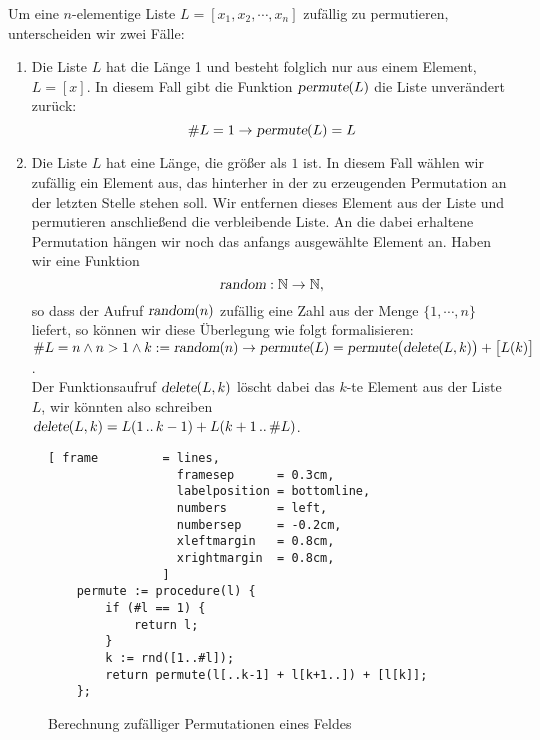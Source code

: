 Um eine $n$-elementige Liste $L = [x_1,x_2, \cdots, x_n]$ zuf\"allig zu permutieren,
unterscheiden wir zwei F\"alle:
\begin{enumerate}
\item Die Liste $L$ hat die L\"ange 1 und besteht folglich nur aus einem Element, $L = [x]$.
      In diesem Fall gibt die Funktion $\textsl{permute}(L)$ die Liste unver\"andert zur\"uck:
      \[ \#L = 1 \rightarrow \textsl{permute}(L) = L \]
\item Die Liste $L$ hat eine L\"ange, die gr\"o\ss{}er als $1$ ist.  In diesem Fall w\"ahlen wir
      zuf\"allig ein Element aus, das hinterher  in der zu erzeugenden Permutation an der letzten Stelle
      stehen soll.  Wir entfernen dieses Element aus der Liste und permutieren
      anschlie\ss{}end die verbleibende Liste.  An die dabei erhaltene Permutation h\"angen wir
      noch das anfangs ausgew\"ahlte Element an.  Haben wir eine Funktion
      \[ \textsl{random}: \mathbb{N} \rightarrow \mathbb{N}, \]
      so dass der Aufruf $\textsl{random}(n)$ zuf\"allig eine Zahl aus der Menge $\{1,\cdots,n\}$
      liefert, so k\"onnen wir diese \"Uberlegung wie folgt formalisieren:
      \\[0.2cm]
      \hspace*{-0.8cm}
      $\#L = n \wedge n > 1 \wedge k :=\textsl{random}(n)  \rightarrow 
         \textsl{permute}(L) = \textsl{permute}\bigl(\textsl{delete}(L,k)\bigr) + \bigl[ L(k)
         \bigr]
      $.
\\[0.2cm]
      Der  Funktionsaufruf $\textsl{delete}(L,k)$ l\"oscht dabei das $k$-te Element aus der Liste $L$,
      wir k\"onnten also schreiben
      \\[0.2cm]
      \hspace*{1.3cm}
      $\textsl{delete}(L,k) = L(1\,..\,k-1) + L(k+1\,..\,\#L)$.
\end{enumerate}

\begin{figure}[!ht]
\centering
\begin{Verbatim}[ frame         = lines, 
                  framesep      = 0.3cm, 
                  labelposition = bottomline,
                  numbers       = left,
                  numbersep     = -0.2cm,
                  xleftmargin   = 0.8cm,
                  xrightmargin  = 0.8cm,
                ]
    permute := procedure(l) {
        if (#l == 1) {
            return l;
        }
        k := rnd([1..#l]);
        return permute(l[..k-1] + l[k+1..]) + [l[k]];
    };
\end{Verbatim}
\vspace*{-0.3cm}
\caption{Berechnung zuf\"alliger Permutationen eines Feldes}
\label{fig:permutation.stlx}
\end{figure}

